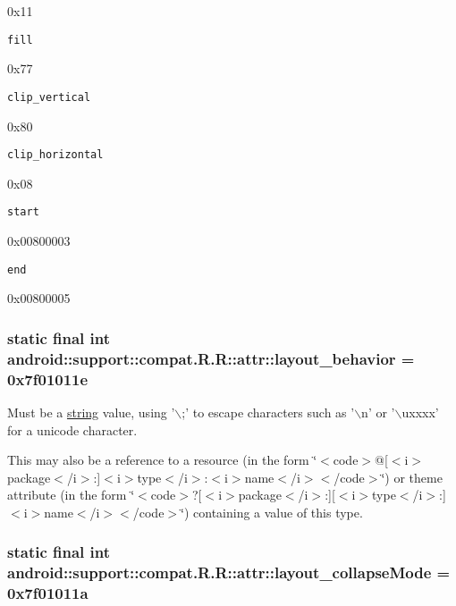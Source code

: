 0x11

{\tt fill}

0x77

{\tt clip\_\-vertical}

0x80

{\tt clip\_\-horizontal}

0x08

{\tt start}

0x00800003

{\tt end}

0x00800005\hypertarget{classandroid_1_1support_1_1compat_1_1_r_1_1attr_b9d4541527963a9a97314ac6f93e7bb4}{
\subsubsection[{layout\_\-behavior}]{\setlength{\rightskip}{0pt plus 5cm}static final int android::support::compat.R.R::attr::layout\_\-behavior = 0x7f01011e}}
\label{classandroid_1_1support_1_1compat_1_1_r_1_1attr_b9d4541527963a9a97314ac6f93e7bb4}


Must be a \hyperlink{classandroid_1_1support_1_1compat_1_1_r_1_1string}{string} value, using '$\backslash$;' to escape characters such as '$\backslash$n' or '$\backslash$uxxxx' for a unicode character. 

This may also be a reference to a resource (in the form \char`\"{}$<$code$>$@\mbox{[}$<$i$>$package$<$/i$>$:\mbox{]}$<$i$>$type$<$/i$>$:$<$i$>$name$<$/i$>$$<$/code$>$\char`\"{}) or theme attribute (in the form \char`\"{}$<$code$>$?\mbox{[}$<$i$>$package$<$/i$>$:\mbox{]}\mbox{[}$<$i$>$type$<$/i$>$:\mbox{]}$<$i$>$name$<$/i$>$$<$/code$>$\char`\"{}) containing a value of this type. \hypertarget{classandroid_1_1support_1_1compat_1_1_r_1_1attr_42f1189dcf728e70dba29ce0dc199a7e}{
\subsubsection[{layout\_\-collapseMode}]{\setlength{\rightskip}{0pt plus 5cm}static final int android::support::compat.R.R::attr::layout\_\-collapseMode = 0x7f01011a}}
\label{classandroid_1_1support_1_1compat_1_1_r_1_1attr_42f1189dcf728e70dba29ce0dc199a7e}


